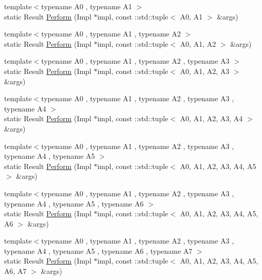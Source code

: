 \begin{DoxyCompactItemize}
\item 
{\footnotesize template$<$typename A0 , typename A1 $>$ }\\static Result \mbox{\hyperlink{classtesting_1_1internal_1_1_action_helper_a71147b30081c44d7d2c776c1781b797c}{Perform}} (Impl $\ast$impl, const \+::std\+::tuple$<$ A0, A1 $>$ \&args)
\item 
{\footnotesize template$<$typename A0 , typename A1 , typename A2 $>$ }\\static Result \mbox{\hyperlink{classtesting_1_1internal_1_1_action_helper_a1f47357f6879b2517b60a3de30c2c634}{Perform}} (Impl $\ast$impl, const \+::std\+::tuple$<$ A0, A1, A2 $>$ \&args)
\item 
{\footnotesize template$<$typename A0 , typename A1 , typename A2 , typename A3 $>$ }\\static Result \mbox{\hyperlink{classtesting_1_1internal_1_1_action_helper_abeefd0482a2e8349cbfd3223eeda503d}{Perform}} (Impl $\ast$impl, const \+::std\+::tuple$<$ A0, A1, A2, A3 $>$ \&args)
\item 
{\footnotesize template$<$typename A0 , typename A1 , typename A2 , typename A3 , typename A4 $>$ }\\static Result \mbox{\hyperlink{classtesting_1_1internal_1_1_action_helper_a79d7d411d9d2149076d8ab672757c9e9}{Perform}} (Impl $\ast$impl, const \+::std\+::tuple$<$ A0, A1, A2, A3, A4 $>$ \&args)
\item 
{\footnotesize template$<$typename A0 , typename A1 , typename A2 , typename A3 , typename A4 , typename A5 $>$ }\\static Result \mbox{\hyperlink{classtesting_1_1internal_1_1_action_helper_a480c73c3de89e2626653ca249e986d03}{Perform}} (Impl $\ast$impl, const \+::std\+::tuple$<$ A0, A1, A2, A3, A4, A5 $>$ \&args)
\item 
{\footnotesize template$<$typename A0 , typename A1 , typename A2 , typename A3 , typename A4 , typename A5 , typename A6 $>$ }\\static Result \mbox{\hyperlink{classtesting_1_1internal_1_1_action_helper_a6746053e045bcd9c1ba85061d2872bb5}{Perform}} (Impl $\ast$impl, const \+::std\+::tuple$<$ A0, A1, A2, A3, A4, A5, A6 $>$ \&args)
\item 
{\footnotesize template$<$typename A0 , typename A1 , typename A2 , typename A3 , typename A4 , typename A5 , typename A6 , typename A7 $>$ }\\static Result \mbox{\hyperlink{classtesting_1_1internal_1_1_action_helper_a25b72af29e06aa5995a1f6c35d2919f3}{Perform}} (Impl $\ast$impl, const \+::std\+::tuple$<$ A0, A1, A2, A3, A4, A5, A6, A7 $>$ \&args)

\end{DoxyCompactItemize}
